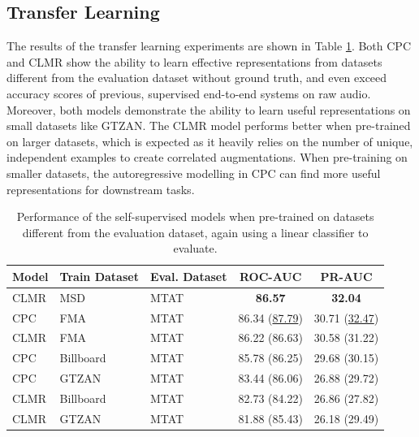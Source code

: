\subsection{Transfer Learning}
The results of the transfer learning experiments are shown in Table \ref{tab:magnatagatune_results}.
Both CPC and CLMR show the ability to learn effective representations from datasets different from the evaluation dataset without ground truth, and even exceed accuracy scores of previous, supervised end-to-end systems on raw audio\cite{dieleman2014end}.
Moreover, both models demonstrate the ability to learn useful representations on small datasets like GTZAN.
The CLMR model performs better when pre-trained on larger datasets, which is expected as it heavily relies on the number of unique, independent examples to create correlated augmentations.
When pre-training on smaller datasets, the autoregressive modelling in CPC can find more useful representations for downstream tasks.

\begin{table}[t]
    \centering
    \begin{tabular}{@{}lllcc@{}}\toprule
        Model & Train Dataset & Eval.
Dataset &  ROC-AUC & PR-AUC \\ \midrule
        CLMR & MSD & MTAT &  \textbf{86.57} & \textbf{32.04} \\
        CPC & FMA & MTAT & 86.34 (\underline{87.79}) & 30.71 (\underline{32.47}) \\
        CLMR & FMA & MTAT & 86.22 (86.63) & 30.58 (31.22) \\
        CPC & Billboard & MTAT & 85.78 (86.25) & 29.68 (30.15) \\
        CPC & GTZAN & MTAT & 83.44 (86.06) & 26.88 (29.72) \\
        CLMR & Billboard & MTAT & 82.73 (84.22) & 26.86 (27.82) \\
        CLMR & GTZAN & MTAT & 81.88 (85.43) & 26.18 (29.49) \\
        \bottomrule
    \end{tabular}
    \caption{Performance of the self-supervised models when pre-trained on datasets different from the evaluation dataset, again using a linear classifier to evaluate.}
    \label{tab:magnatagatune_results}
\end{table}



